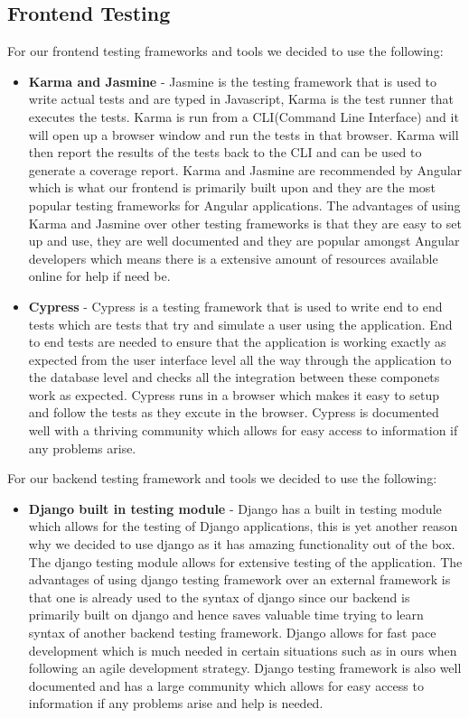 \documentclass[12pt]{article}
\begin{document}
\subsection{Frontend Testing}
For our frontend testing frameworks and tools we decided to use the following:
\begin{itemize}
    \item \textbf{Karma and Jasmine} - Jasmine is the testing framework that is used to write actual tests and are typed in Javascript, Karma is the test runner that executes the tests. Karma is run from a CLI(Command Line Interface) and it will open up a browser window and run the tests in that browser. Karma will then report the results of the tests back to the CLI and can be used to generate a coverage report. Karma and Jasmine are recommended by Angular which is what our frontend is primarily built upon and they are the most popular testing frameworks for Angular applications. The advantages of using Karma and Jasmine over other testing frameworks is that they are easy to set up and use, they are well documented and they are popular amongst Angular developers which means there is a extensive amount of resources available online for help if need be.
    \item \textbf{Cypress} - Cypress is a testing framework that is used to write end to end tests which are tests that try and simulate a user using the application. End to end tests are needed to ensure that the application is working exactly as expected from the user interface level all the way through the application to the database level and checks all the integration between these componets work as expected. Cypress runs in a browser which makes it easy to setup and follow the tests as they excute in the browser. Cypress is documented well with a thriving community which allows for easy access to information if any problems arise.
\end{itemize}
For our backend testing framework and tools we decided to use the following:
\begin{itemize}
    \item \textbf{Django built in testing module} - Django has a built in testing module which allows for the testing of Django applications, this is yet another reason why we decided to use django as it has amazing functionality out of the box. The django testing module allows for extensive testing of the application. The advantages of using django testing framework over an external framework is that one is already used to the syntax of django since our backend is primarily built on django and hence saves valuable time trying to learn syntax of another backend testing framework. Django allows for fast pace development which is much needed in certain situations such as in ours when following an agile development strategy. Django testing framework is also well documented and has a large community which allows for easy access to information if any problems arise and help is needed.
\end{itemize}
\end{document}
